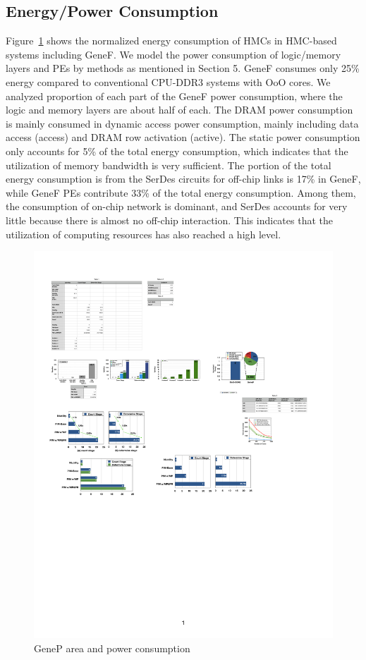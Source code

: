 \documentclass[9pt,conference]{IEEEtran}
\begin{document}
\subsection{Energy/Power Consumption}
Figure~\ref{fig:energy} shows the normalized energy consumption of HMCs in HMC-based systems including GeneF. We model the power consumption of logic/memory layers and PEs by methods as mentioned in Section 5. GeneF consumes only 25\% energy compared to conventional CPU-DDR3 systems with OoO cores. We analyzed proportion of each part of the GeneF power consumption, where the logic and memory layers are about half of each. The DRAM power consumption is mainly consumed in dynamic access power consumption, mainly including data access (access) and DRAM row activation (active). The static power consumption only accounts for 5\% of the total energy consumption, which indicates that the utilization of memory bandwidth is very sufficient. The portion of the total energy consumption is from the SerDes circuits for off-chip links is 17\% in GeneF, while GeneF PEs contribute 33\% of the total energy consumption. Among them, the consumption of on-chip network is dominant, and SerDes accounts for very little because there is almost no off-chip interaction. This indicates that the utilization of computing resources has also reached a high level.

\begin{figure}[!htbp]
\centering
\includegraphics[scale=0.4]{fig/energy.pdf}
\caption{GeneP area and power consumption}
\label{fig:energy}
\end{figure}
\end{document}
